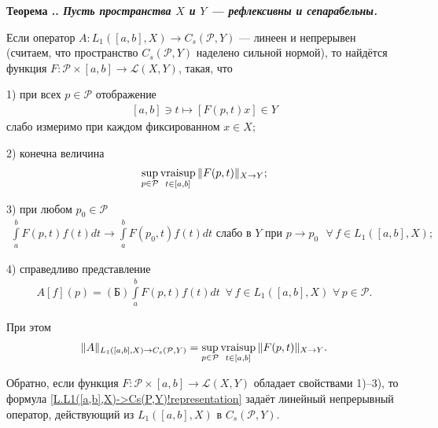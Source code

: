 \documentclass{report}
\newcounter{rem}[section]
\newcounter{theor}[section]
\renewcommand{\thetheor}{\thesection.\arabic{theor}}
\newenvironment{Theorem}{\par\refstepcounter{theor}\bf Теорема \thetheor. \it}{\rm\par}
\newcommand{\vraisup}{\mathop{\rm vraisup}}
\begin{document}
\begin{Theorem}\label{L.L1([a,b],X)->Cs(P,Y)!theorem}
Пусть пространства $X$ и $Y$ --- рефлексивны и сепарабельны.

Если оператор $A:L_1([a,b],X)\to C_s(\mathcal{P},Y)$ --- линеен и непрерывен (считаем, что пространство
$C_s(\mathcal{P},Y)$ наделено сильной нормой), то найдётся функция $F:\mathcal{P}\times[a,b]\to\mathcal{L}(X,Y)$, такая, что

1) при всех $p\in\mathcal{P}$ отображение
    \begin{gather}\label{L.L1([a,b],X)->Cs(P,Y)!weak.measurability.wrt.t}
    [a,b]\ni t\mapsto [F(p,t)x]\in Y
    \end{gather}
слабо измеримо при каждом фиксированном $x\in X$;

2) конечна величина
\begin{gather}\label{L.L1([a,b],X)->Cs(P,Y)!vraisup.wrt.t}
\sup\limits_{p\in\mathcal{P}}\vraisup\limits_{t\in[a,b]}\|F(p,t)\|_{X\to Y};
\end{gather}

3) при любом $p_0\in\mathcal{P}$
\begin{gather}\label{L.L1([a,b],X)->Cs(P,Y)!limit.wrt.p.of.int.a.bF(p,t)f(t)dt}
\int\limits_a^bF(p,t)f(t)dt\to\int\limits_a^bF(p_0,t)f(t)dt\text{ слабо в $Y$ при $p\to p_0$ }\forall\,f\in L_1([a,b],X);
\end{gather}

4) справедливо представление
    \begin{gather}\label{L.L1([a,b],X)->Cs(P,Y)!representation}
A[f](p)=(\textrm{Б})\int\limits_a^bF(p,t)f(t)dt\,\,\,\forall\,f\in L_1([a,b],X)\,\,\forall\,p\in \mathcal{P}.
    \end{gather}

При этом
\begin{gather}\label{L.L1([a,b],X)->Cs(P,Y)!norm}
\|A\|_{L_1([a,b],X)\to C_s(\mathcal{P},Y)}=\sup\limits_{p\in\mathcal{P}}\vraisup\limits_{t\in[a,b]}\|F(p,t)\|_{X\to Y}.
\end{gather}

Обратно, если функция $F:\mathcal{P}\times[a,b]\to\mathcal{L}(X,Y)$ обладает свойствами 1)--3), то формула \eqref{L.L1([a,b],X)->Cs(P,Y)!representation} задаёт линейный непрерывный
оператор, действующий из $L_1([a,b],X)$ в $C_s(\mathcal{P},Y)$.
\end{Theorem}
\end{document}
